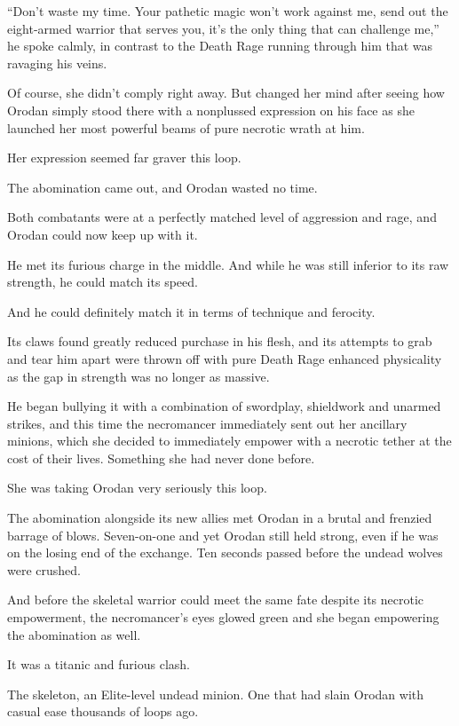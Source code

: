 \documentclass[a4paper,10pt]{book}
\begin{document}
“Don’t waste my time. Your pathetic magic won’t work against me, send out the eight-armed warrior that serves you, it’s the only thing that can challenge me,” he spoke calmly, in contrast to the Death Rage running through him that was ravaging his veins.\par
Of course, she didn’t comply right away. But changed her mind after seeing how Orodan simply stood there with a nonplussed expression on his face as she launched her most powerful beams of pure necrotic wrath at him.\par
Her expression seemed far graver this loop.\par
The abomination came out, and Orodan wasted no time.\par
Both combatants were at a perfectly matched level of aggression and rage, and Orodan could now keep up with it.\par
He met its furious charge in the middle. And while he was still inferior to its raw strength, he could match its speed.\par
And he could definitely match it in terms of technique and ferocity.\par
Its claws found greatly reduced purchase in his flesh, and its attempts to grab and tear him apart were thrown off with pure Death Rage enhanced physicality as the gap in strength was no longer as massive.\par
He began bullying it with a combination of swordplay, shieldwork and unarmed strikes, and this time the necromancer immediately sent out her ancillary minions, which she decided to immediately empower with a necrotic tether at the cost of their lives. Something she had never done before.\par
She was taking Orodan very seriously this loop.\par
The abomination alongside its new allies met Orodan in a brutal and frenzied barrage of blows. Seven-on-one and yet Orodan still held strong, even if he was on the losing end of the exchange. Ten seconds passed before the undead wolves were crushed.\par
And before the skeletal warrior could meet the same fate despite its necrotic empowerment, the necromancer’s eyes glowed green and she began empowering the abomination as well.\par
It was a titanic and furious clash.\par
The skeleton, an Elite-level undead minion. One that had slain Orodan with casual ease thousands of loops ago.\par
\end{document}
